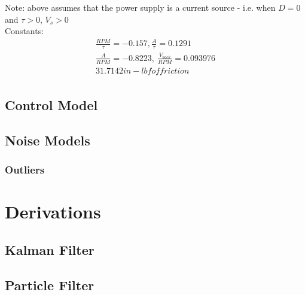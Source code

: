 \documentclass[a4paper,10pt]{report}
\begin{document}
Note: above assumes that the power supply is a current source - i.e. when $D = 0$ and $\tau > 0$, $V_s > 0$ \\

Constants:
\begin{gather*}
\frac{RPM}{\tau} = -0.157, \frac{A}{\tau} = 0.1291 \\
\frac{A}{RPM} = -0.8223, \ \frac{V_{back}}{RPM} = 0.093976 \\
31.7142 in-lbf of friction \\
\end{gather*}

\section{Control Model}

\section{Noise Models}

\subsection{Outliers}

\appendix
\chapter{Derivations}
\section{Kalman Filter}
\section{Particle Filter}
\end{document}
